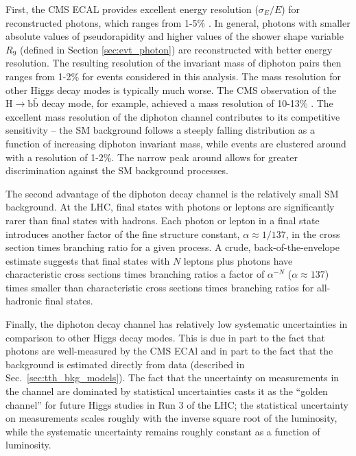 First, the CMS ECAL provides excellent energy resolution ($\sigma_E/E$) for reconstructed photons, which ranges from 1-5\% \cite{Chatrchyan:2013dga}.
In general, photons with smaller absolute values of pseudorapidity and higher values of the shower shape variable $R_9$ (defined in Section \ref{sec:evt_photon}) are reconstructed with better energy resolution.
The resulting resolution of the invariant mass of diphoton pairs then ranges from 1-2\% for events considered in this analysis.
The mass resolution for other Higgs decay modes is typically much worse.
The CMS observation of the $\text{H} \to \text{b}\bar{\text{b}}$ decay mode, for example, achieved a mass resolution of 10-13\% \cite{Hbb_obs}.
The excellent mass resolution of the diphoton channel contributes to its competitive sensitivity -- the SM background follows a steeply falling distribution as a function of increasing diphoton invariant mass, while \Hgg events are clustered around \mH with a resolution of 1-2\%.
The narrow peak around \mH allows for greater discrimination against the SM background processes.

The second advantage of the diphoton decay channel is the relatively small SM background.
At the LHC, final states with photons or leptons are significantly rarer than final states with hadrons.
Each photon or lepton in a final state introduces another factor of the fine structure constant, $\alpha \approx 1/137$, in the cross section times branching ratio for a given process. 
A crude, back-of-the-envelope estimate suggests that final states with $N$ leptons plus photons have characteristic cross sections times branching ratios a factor of $\alpha^{-N}$ ($\alpha \approx 137$) times smaller than characteristic cross sections times branching ratios for all-hadronic final states.

Finally, the diphoton decay channel has relatively low systematic uncertainties in comparison to other Higgs decay modes.
This is due in part to the fact that photons are well-measured by the CMS ECAl and in part to the fact that the background is estimated directly from data (described in Sec.~\ref{sec:tth_bkg_models}).
The fact that the uncertainty on measurements in the \Hgg channel are dominated by statistical uncertainties casts it as the ``golden channel'' for future Higgs studies in Run 3 of the LHC; the statistical uncertainty on measurements scales roughly with the inverse square root of the luminosity, while the systematic uncertainty remains roughly constant as a function of luminosity.

